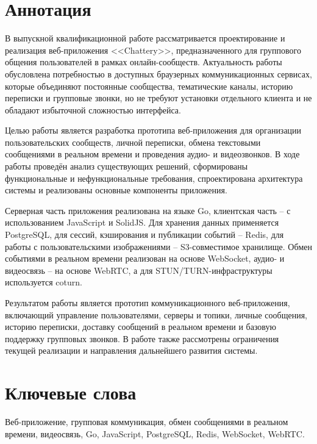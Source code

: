 \documentclass[a4paper,12pt]{extarticle}
\begin{document}

\newpage
\setcounter{page}{2}

{
	\hypersetup{linkcolor=black}
	\tableofcontents
}

\newpage

\newpage
\section*{Аннотация}

В выпускной квалификационной работе рассматривается проектирование и реализация веб-приложения <<Chattery>>, предназначенного для группового общения пользователей в рамках онлайн-сообществ. Актуальность работы обусловлена потребностью в доступных браузерных коммуникационных сервисах, которые объединяют постоянные сообщества, тематические каналы, историю переписки и групповые звонки, но не требуют установки отдельного клиента и не обладают избыточной сложностью интерфейса.

Целью работы является разработка прототипа веб-приложения для организации пользовательских сообществ, личной переписки, обмена текстовыми сообщениями в реальном времени и проведения аудио- и видеозвонков. В ходе работы проведён анализ существующих решений, сформированы функциональные и нефункциональные требования, спроектирована архитектура системы и реализованы основные компоненты приложения.

Серверная часть приложения реализована на языке Go, клиентская часть -- с использованием JavaScript и SolidJS. Для хранения данных применяется PostgreSQL, для сессий, кэширования и публикации событий -- Redis, для работы с пользовательскими изображениями -- S3-совместимое хранилище. Обмен событиями в реальном времени реализован на основе WebSocket, аудио- и видеосвязь -- на основе WebRTC, а для STUN/TURN-инфраструктуры используется coturn.

Результатом работы является прототип коммуникационного веб-приложения, включающий управление пользователями, серверы и топики, личные сообщения, историю переписки, доставку сообщений в реальном времени и базовую поддержку групповых звонков. В работе также рассмотрены ограничения текущей реализации и направления дальнейшего развития системы.


\section*{Ключевые слова}
Веб-приложение, групповая коммуникация, обмен сообщениями в реальном времени, видеосвязь, Go, JavaScript, PostgreSQL, Redis, WebSocket, WebRTC.
\pagebreak
\end{document}
